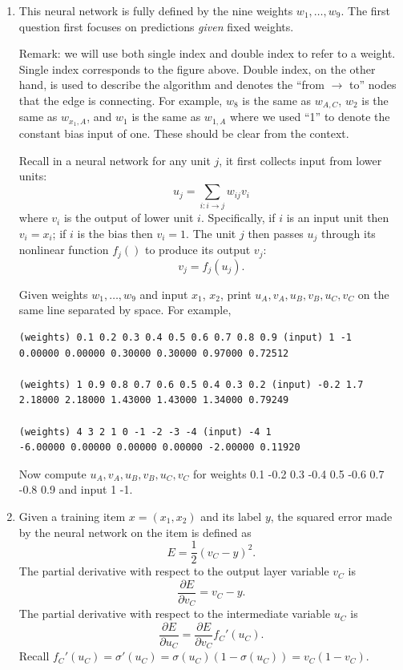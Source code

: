 \documentclass[a4paper]{article}
\theoremstyle{definition}
\begin{document}
\begin{enumerate}
\item
This neural network is fully defined by the nine weights $w_1, \ldots, w_9$.
The first question first focuses on predictions \emph{given} fixed weights.

Remark: we will use both single index and double index to refer to a weight.
Single index corresponds to the figure above.
Double index, on the other hand, is used to describe the algorithm and denotes the ``from $\rightarrow$ to'' nodes that the edge is connecting.
For example, $w_8$ is the same as $w_{A,C}$, $w_2$ is the same as $w_{x_1, A}$, and $w_1$ is the same as $w_{1,A}$ where we used ``1'' to denote the constant bias input of one.
These should be clear from the context.

Recall in a neural network for any unit $j$, it first collects input from lower units:
$$u_j = \sum_{i: i\rightarrow j} w_{ij} v_i$$
where $v_i$ is the output of lower unit $i$. Specifically, if $i$ is an input unit then $v_i=x_i$; if $i$ is the bias then $v_i=1$.
The unit $j$ then passes $u_j$ through its nonlinear function $f_j()$ to produce its output $v_j$:
$$v_j = f_j(u_j).$$

Given weights $w_1, \ldots, w_9$ and input $x_1$, $x_2$,
print $u_A, v_A, u_B, v_B, u_C, v_C$ on the same line separated by space. 
For example,
\begin{verbatim}
(weights) 0.1 0.2 0.3 0.4 0.5 0.6 0.7 0.8 0.9 (input) 1 -1
0.00000 0.00000 0.30000 0.30000 0.97000 0.72512 

(weights) 1 0.9 0.8 0.7 0.6 0.5 0.4 0.3 0.2 (input) -0.2 1.7
2.18000 2.18000 1.43000 1.43000 1.34000 0.79249 

(weights) 4 3 2 1 0 -1 -2 -3 -4 (input) -4 1
-6.00000 0.00000 0.00000 0.00000 -2.00000 0.11920 
\end{verbatim}

Now compute $u_A, v_A, u_B, v_B, u_C, v_C$ for weights 0.1 -0.2 0.3 -0.4 0.5 -0.6 0.7 -0.8 0.9 and input 1 -1.

\item
Given a training item $x=(x_1, x_2)$ and its label $y$, the squared error made by the neural network on the item is defined as
$$E = \frac{1}{2}(v_C - y)^2.$$
The partial derivative with respect to the output layer variable $v_C$ is 
$$\frac{\partial E}{\partial v_C} = v_C - y.$$
The partial derivative with respect to the intermediate variable $u_C$ is 
$$\frac{\partial E}{\partial u_C} = \frac{\partial E}{\partial v_C} f_C'(u_C).$$
Recall $f_C'(u_C) = \sigma'(u_C) = \sigma(u_C)(1-\sigma(u_C)) = v_C (1-v_C)$.


\end{enumerate}
\end{document}
